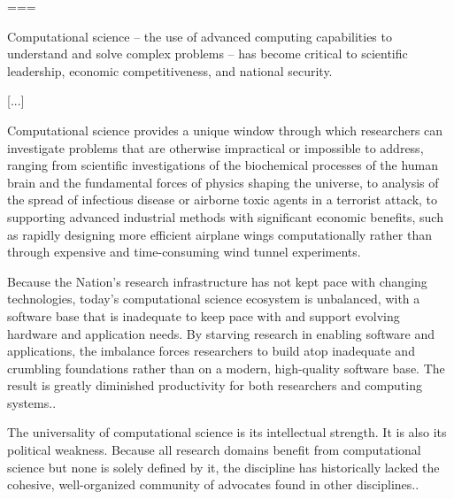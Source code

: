 \cite{pitac2005}
===

\begin{citacao}
Computational science – the use of advanced computing capabilities to understand and solve complex problems – has become critical to scientific leadership, economic competitiveness, and national security. 

[...]

Computational science provides a unique window through which researchers can investigate problems that are otherwise impractical or impossible to address, ranging from scientific investigations of the biochemical processes of the human brain and the fundamental forces of physics shaping the universe, to analysis of the spread of infectious disease or airborne toxic agents in a terrorist attack, to supporting advanced industrial methods with significant economic benefits, such as rapidly designing more efficient airplane wings computationally rather than through expensive and time-consuming wind tunnel experiments.\cite[pg. iii]{pitac2005}
\end{citacao}


Because the Nation’s research infrastructure has not kept pace with changing technologies, today’s computational science ecosystem is unbalanced, with a software base that is inadequate to keep pace with and support evolving hardware and application needs. By starving research in enabling software and applications, the imbalance forces researchers to build atop inadequate and crumbling foundations rather than on a modern, high-quality software base. The result is greatly diminished productivity for both researchers and computing systems.\cite[pg. 3]{pitac2005}.

The universality of computational science is its intellectual strength. It is also its political weakness. Because all research domains benefit from computational science but none is solely defined by it, the discipline has historically lacked the cohesive, well-organized community of advocates found in other disciplines.\cite[pg. 5, 15]{pitac2005}.

